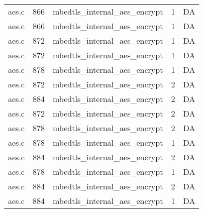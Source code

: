 \begin{table}[h]
{\begin{tabular}{clrrr}
aes.c&866&mbedtls\_internal\_aes\_encrypt&1 &DA\\
aes.c&866&mbedtls\_internal\_aes\_encrypt&1 &DA\\
aes.c&872&mbedtls\_internal\_aes\_encrypt&1 &DA\\
aes.c&872&mbedtls\_internal\_aes\_encrypt&1 &DA\\
aes.c&878&mbedtls\_internal\_aes\_encrypt&1 &DA\\
aes.c&872&mbedtls\_internal\_aes\_encrypt&2 &DA\\
aes.c&884&mbedtls\_internal\_aes\_encrypt&2 &DA\\
aes.c&872&mbedtls\_internal\_aes\_encrypt&2 &DA\\
aes.c&878&mbedtls\_internal\_aes\_encrypt&2 &DA\\
aes.c&878&mbedtls\_internal\_aes\_encrypt&1 &DA\\
aes.c&884&mbedtls\_internal\_aes\_encrypt&2 &DA\\
aes.c&878&mbedtls\_internal\_aes\_encrypt&1 &DA\\
aes.c&884&mbedtls\_internal\_aes\_encrypt&2 &DA\\
aes.c&884&mbedtls\_internal\_aes\_encrypt&1 &DA\\
\hline
\end{tabular}
}
\end{table}